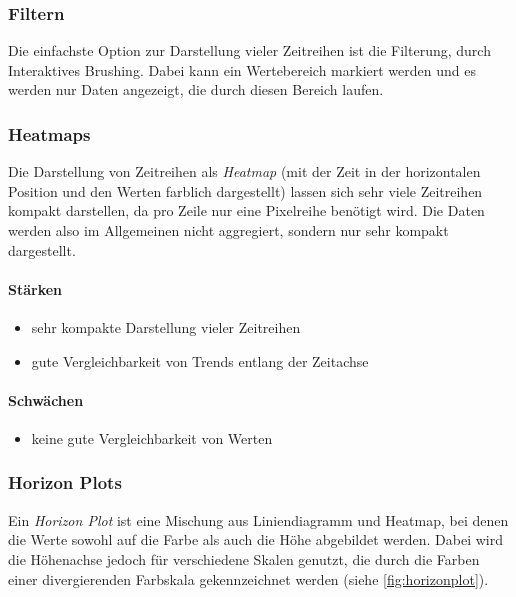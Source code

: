 			\subsubsection{Filtern}
				Die einfachste Option zur Darstellung vieler Zeitreihen ist die Filterung, \bspw durch Interaktives Brushing. Dabei kann \zB ein Wertebereich markiert werden und es werden nur Daten angezeigt, die durch diesen Bereich laufen.

			\subsubsection{Heatmaps}
				Die Darstellung von Zeitreihen als \emph{Heatmap} (mit der Zeit in der horizontalen Position und den Werten farblich dargestellt) lassen sich sehr viele Zeitreihen kompakt darstellen, da pro Zeile nur eine Pixelreihe benötigt wird. Die Daten werden also im Allgemeinen nicht aggregiert, sondern nur sehr kompakt dargestellt.

				\paragraph{Stärken}
				\begin{itemize}
					\item sehr kompakte Darstellung vieler Zeitreihen
					\item gute Vergleichbarkeit von Trends entlang der Zeitachse
				\end{itemize}

				\paragraph{Schwächen}
				\begin{itemize}
					\item keine gute Vergleichbarkeit von Werten
				\end{itemize}

			\subsubsection{Horizon Plots}
				Ein \emph{Horizon Plot} ist eine Mischung aus Liniendiagramm und Heatmap, bei denen die Werte sowohl auf die Farbe als auch die Höhe abgebildet werden. Dabei wird die Höhenachse jedoch für verschiedene Skalen genutzt, die durch die Farben einer divergierenden Farbskala gekennzeichnet werden (siehe \autoref{fig:horizonplot}).

